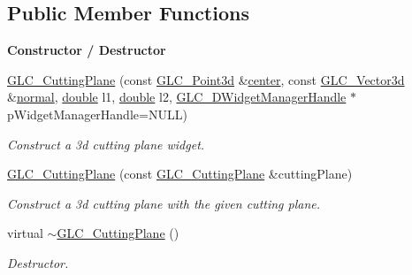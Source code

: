 \subsection*{Public Member Functions}
\begin{Indent}{\bf Constructor / Destructor}\par
\begin{DoxyCompactItemize}
\item 
\hyperlink{class_g_l_c___cutting_plane_adb2d0cfde9b5f9ddd3ce9280dca48ac0}{G\-L\-C\-\_\-\-Cutting\-Plane} (const \hyperlink{glc__vector3d_8h_a4e13a9bbc7ab3d34de7e98b41836772c}{G\-L\-C\-\_\-\-Point3d} \&\hyperlink{class_g_l_c___cutting_plane_af58a0f0ccbbd7b02f754397241558b8c}{center}, const \hyperlink{class_g_l_c___vector3d}{G\-L\-C\-\_\-\-Vector3d} \&\hyperlink{class_g_l_c___cutting_plane_af469fadf296434eee46c4ba187ed07e6}{normal}, \hyperlink{_super_l_u_support_8h_a8956b2b9f49bf918deed98379d159ca7}{double} l1, \hyperlink{_super_l_u_support_8h_a8956b2b9f49bf918deed98379d159ca7}{double} l2, \hyperlink{class_g_l_c__3_d_widget_manager_handle}{G\-L\-C\-\_\-D\-Widget\-Manager\-Handle} $\ast$p\-Widget\-Manager\-Handle=N\-U\-L\-L)
\begin{DoxyCompactList}\small\item\em Construct a 3d cutting plane widget. \end{DoxyCompactList}\item 
\hyperlink{class_g_l_c___cutting_plane_ab27f38b9ae184394fc8db3eac9a45806}{G\-L\-C\-\_\-\-Cutting\-Plane} (const \hyperlink{class_g_l_c___cutting_plane}{G\-L\-C\-\_\-\-Cutting\-Plane} \&cutting\-Plane)
\begin{DoxyCompactList}\small\item\em Construct a 3d cutting plane with the given cutting plane. \end{DoxyCompactList}\item 
virtual \hyperlink{class_g_l_c___cutting_plane_aabf1ed6bac9528991dab821450281148}{$\sim$\-G\-L\-C\-\_\-\-Cutting\-Plane} ()
\begin{DoxyCompactList}\small\item\em Destructor. \end{DoxyCompactList}\end{DoxyCompactItemize}
\end{Indent}

